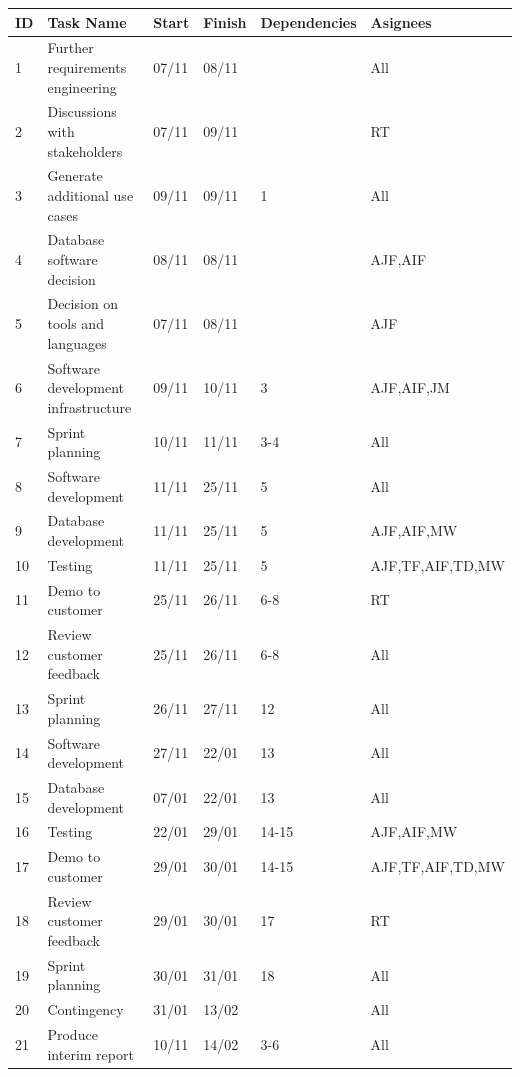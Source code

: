 \begin{table}[H]
\centering
\begin{tabular}{|p{0.6cm}|p{5.7cm}|p{1.1cm}|p{1.1cm}|p{2.4cm}|p{3.3cm}|}
	\hline
	\rowcolor{titleColor}\textbf{ID} & \textbf{Task Name} & \textbf{Start} & \textbf{Finish} & \textbf{Dependencies} & \textbf{Asignees} \\ \hline
	1 & Further requirements engineering & 07/11 & 08/11 &  & All \\ \hline
	2 & Discussions with stakeholders & 07/11 & 09/11 &  & RT \\ \hline
	3 & Generate additional use cases & 09/11 & 09/11 & 1 & All \\ \hline
	4 & Database software decision & 08/11 & 08/11 &  & AJF,AIF \\ \hline
	5 & Decision on tools and languages & 07/11 & 08/11 &  & AJF \\ \hline
	6 & Software development infrastructure & 09/11 & 10/11 & 3 & AJF,AIF,JM \\ \hline
	7 & Sprint planning & 10/11 & 11/11 & 3-4 & All \\ \hline
	8 & Software development & 11/11 & 25/11 & 5 & All \\ \hline
	9 & Database development & 11/11 & 25/11 & 5 & AJF,AIF,MW \\ \hline
	10 & Testing & 11/11 & 25/11 & 5 & AJF,TF,AIF,TD,MW \\ \hline
	11 & Demo to customer & 25/11 & 26/11 & 6-8 & RT \\ \hline
	12 & Review customer feedback & 25/11 & 26/11 & 6-8 & All \\ \hline
	13 & Sprint planning & 26/11 & 27/11 & 12 & All \\ \hline
	14 & Software development & 27/11 & 22/01 & 13 & All \\ \hline
	15 & Database development & 07/01 & 22/01 & 13 & All \\ \hline
	16 & Testing & 22/01 & 29/01 & 14-15 & AJF,AIF,MW \\ \hline
	17 & Demo to customer & 29/01 & 30/01 & 14-15 & AJF,TF,AIF,TD,MW \\ \hline
	18 & Review customer feedback & 29/01 & 30/01 & 17 & RT \\ \hline
	19 & Sprint planning & 30/01 & 31/01 & 18 & All \\ \hline
	20 & Contingency & 31/01 & 13/02 &  & All \\ \hline
	21 & Produce interim report & 10/11 & 14/02 & 3-6 & All \\ \hline
\end{tabular}
\end{table}
